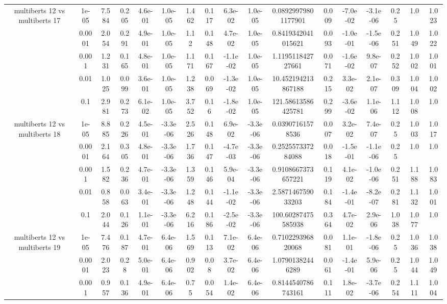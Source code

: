 \begin{tabular}{|c|c|c|c|c|c|c|c|c|c|c|c|c|c|c|c|c|}
\hline
\multirow{5}{*}{multiberts 12 vs multiberts 17} & 1e-05 & 7.584 & 0.205 & 4.6e-01 & 1.0e-05 & 1.462 & 0.117 & 6.3e-02 & 1.0e-05 & 0.08929979801177901 & 0.009 & -7.0e-02 & -3.1e-06 & 0.25 & 1.0 & 1.023 \\
 & 0.0001 & 2.054 & 0.291 & 4.9e-01 & 1.0e-05 & 1.12 & 0.148 & 4.7e-02 & 1.0e-05 & 0.8419342041015621 & 0.093 & -1.0e-01 & -1.5e-06 & 0.251 & 1.049 & 1.022 \\
 & 0.001 & 1.231 & 0.165 & 4.8e-01 & 1.0e-05 & 1.171 & 0.167 & -1.1e-02 & 1.0e-05 & 1.119511842727661 & 0.071 & -1.6e-02 & 9.8e-07 & 0.252 & 1.002 & 1.001 \\
 & 0.01 & 1.025 & 0.099 & 3.6e-01 & 1.0e-05 & 1.238 & 0.069 & -1.3e-02 & 1.0e-05 & 10.452194213867188 & 0.215 & 3.3e-02 & 2.1e-07 & 0.309 & 1.004 & 1.002 \\
 & 0.1 & 2.981 & 0.273 & 6.1e-02 & 1.0e-05 & 3.752 & 0.16 & -1.8e-02 & 1.0e-05 & 121.58613586425781 & 0.299 & -3.6e-02 & 1.1e-06 & 1.112 & 1.008 & 1.0 \\
\hline
\multirow{5}{*}{multiberts 12 vs multiberts 18} & 1e-05 & 8.885 & 0.226 & 4.5e-01 & -3.3e-06 & 2.526 & 0.148 & 6.9e-02 & -3.3e-06 & 0.03907161578536 & 0.007 & 3.2e-02 & 7.4e-07 & 0.25 & 1.003 & 1.017 \\
 & 0.0001 & 2.164 & 0.305 & 4.8e-01 & -3.3e-06 & 1.736 & 0.147 & -4.7e-03 & -3.3e-06 & 0.252557337284088 & 0.018 & -1.5e-01 & -1.1e-06 & 0.25 & 1.0 & 1.0 \\
 & 0.001 & 1.582 & 0.236 & 4.7e-01 & -3.3e-06 & 1.359 & 0.146 & 5.9e-04 & -3.3e-06 & 0.9108667373657221 & 0.119 & 4.1e-02 & -1.0e-06 & 0.251 & 1.188 & 1.083 \\
 & 0.01 & 0.858 & 0.063 & 3.4e-01 & -3.3e-06 & 1.248 & 0.144 & -1.1e-02 & -3.3e-06 & 2.587146759033203 & 0.184 & -1.4e-01 & -8.2e-07 & 0.281 & 1.132 & 1.001 \\
 & 0.1 & 2.044 & 0.126 & 1.1e-01 & -3.3e-06 & 6.216 & 0.186 & -2.5e-02 & -3.3e-06 & 100.60287475585938 & 0.364 & 4.7e-02 & 2.9e-06 & 1.038 & 1.077 & 1.0 \\
\hline
\multirow{5}{*}{multiberts 12 vs multiberts 19} & 1e-05 & 7.476 & 0.187 & 4.7e-01 & 6.4e-06 & 1.569 & 0.113 & 7.1e-02 & 6.4e-06 & 0.710229396820068 & 0.081 & 1.1e-01 & -1.8e-06 & 0.25 & 1.036 & 1.038 \\
 & 0.0001 & 2.023 & 0.28 & 5.0e-01 & 6.4e-06 & 0.902 & 0.08 & 3.7e-02 & 6.4e-06 & 1.07901382446289 & 0.061 & -1.4e-01 & 5.9e-06 & 0.25 & 1.044 & 1.049 \\
 & 0.001 & 0.957 & 0.136 & 4.9e-01 & 6.4e-06 & 0.75 & 0.054 & 1.4e-02 & 6.4e-06 & 0.8144540786743161 & 0.111 & 1.8e-02 & -3.7e-06 & 0.254 & 1.111 & 1.004 \\

\end{tabular}
